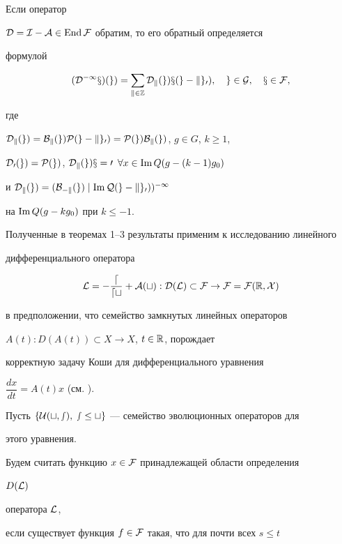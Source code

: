  


\begin{cornonum} Если оператор 


$\cal D=I-A\in\operatorname{End}\cal F$ обратим, то его обратный определяется 


формулой 


$$ 


(\cal D^{-1}x)(g)=\sum_{k\in\Bbb Z}\cal D_k(g)x(g-kg_0), 


\quad g\in G,\quad x\in\cal F, 


$$ 


где 


$\cal D_k(g)=B_k(g)P(g-kg_0)=P(g)B_k(g)$, $g\in G$, $k\ge 1$, 


$\cal D_0(g)=P(g)$, $\cal D_k(g)x=0$ $\forall x\in\operatorname{Im} Q(g-(k-1)g_0)$ 


и $\cal D_k(g)=(B_{-k}(g)\mid\operatorname{Im} Q(g-kg_0))^{-1}$ 


на $\operatorname{Im} Q(g-kg_0)$ при $k\le -1$. 


\end{cornonum} 


 


Полученные в теоремах 1--3 результаты применим к исследованию линейного 


дифференциального оператора 


$$ 


\cal L=-\frac{d}{dt}+A(t):D(\cal L)\subset\cal F\to\cal F= 


\cal F(\Bbb R,X) 


$$ 


в предположении, что семейство замкнутых линейных операторов 


$A(t):D(A(t))\subset X\to X$, $t\in\Bbb R$, порождает 


корректную задачу Коши для дифференциального уравнения 


$\dfrac{dx}{dt}=A(t)x$ (см. \cite{Kre}). 


Пусть $\{\cal U(t,s),\;s\le t\}$ --- семейство эволюционных операторов для 


этого уравнения. 


 


Будем считать функцию $x\in\cal F$ принадлежащей области определения 


$D(\cal L)$ 


оператора $\cal L$, 


если существует функция $f\in\cal F$ такая, что для почти всех $s\le t$ 


